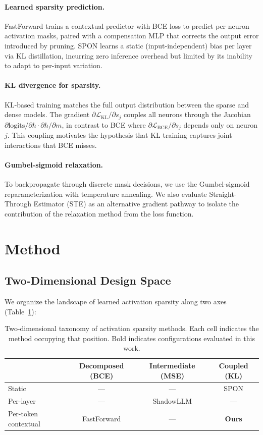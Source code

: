 \documentclass[11pt]{article}
\begin{document}
\paragraph{Learned sparsity prediction.}
FastForward trains a contextual predictor with BCE loss to predict per-neuron activation masks, paired with a compensation MLP that corrects the output error introduced by pruning. SPON learns a static (input-independent) bias per layer via KL distillation, incurring zero inference overhead but limited by its inability to adapt to per-input variation.

\paragraph{KL divergence for sparsity.}
KL-based training matches the full output distribution between the sparse and dense models. The gradient $\partial \mathcal{L}_{\text{KL}} / \partial s_j$ couples all neurons through the Jacobian $\partial \text{logits} / \partial h \cdot \partial h / \partial m$, in contrast to BCE where $\partial \mathcal{L}_{\text{BCE}} / \partial s_j$ depends only on neuron $j$. This coupling motivates the hypothesis that KL training captures joint interactions that BCE misses.

\paragraph{Gumbel-sigmoid relaxation.}
To backpropagate through discrete mask decisions, we use the Gumbel-sigmoid reparameterization with temperature annealing. We also evaluate Straight-Through Estimator (STE) as an alternative gradient pathway to isolate the contribution of the relaxation method from the loss function.


\section{Method}

\subsection{Two-Dimensional Design Space}

We organize the landscape of learned activation sparsity along two axes (Table~\ref{tab:taxonomy}):

\begin{table}[h]
\centering
\caption{Two-dimensional taxonomy of activation sparsity methods. Each cell indicates the method occupying that position. Bold indicates configurations evaluated in this work.}
\label{tab:taxonomy}
\small
\begin{tabular}{l ccc}
\toprule
& Decomposed (BCE) & Intermediate (MSE) & Coupled (KL) \\
\midrule
Static & --- & --- & SPON \\
Per-layer & --- & ShadowLLM & --- \\
Per-token contextual & FastForward & --- & \textbf{Ours} \\
\bottomrule
\end{tabular}
\end{table}
\end{document}
